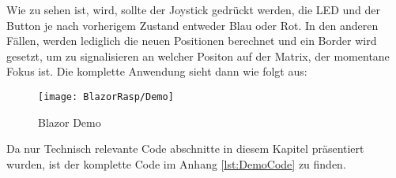 Wie zu sehen ist, wird, sollte der Joystick gedrückt werden, die LED und der Button je
nach vorherigem Zustand entweder Blau oder Rot. In den anderen Fällen, werden lediglich die neuen
Positionen berechnet und ein Border wird gesetzt, um zu signalisieren an welcher Positon auf der
Matrix, der momentane Fokus ist.
\newline
\newline
Die komplette Anwendung sieht dann wie folgt aus:

\begin{figure}[h]
    \centering
    \texttt{[image: BlazorRasp/Demo]}
    \caption[Blazor Demo]{Blazor Demo}
    \label{img:BlazorDatenAnzeigen}
\end{figure}

Da nur Technisch relevante Code abschnitte in diesem Kapitel präsentiert wurden, ist der
komplette Code im Anhang \ref{lst:DemoCode} zu finden.